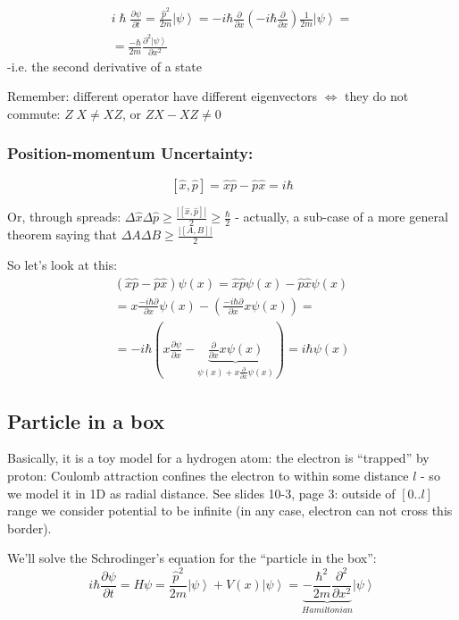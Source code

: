 \documentclass{scrartcl}
\newcommand{\ket}[1]{\left| #1 \right>} %
\begin{document}
\begin{gather*}
  i \; \hbar \; \frac{\partial \psi}{\partial t} = \frac{\hat p^2}{2 m} \ket
  \psi = -i \hbar \frac\partial{\partial x} (-i \hbar \frac\partial{\partial x})
  \frac1{2m} \ket\psi = \\
  = \frac{-\hbar}{2m}\frac{\partial^2 \ket\psi}{\partial x^2}
\end{gather*}
-i.e. the second derivative of a state

Remember: different operator have different eigenvectors $\Leftrightarrow$ they
do not commute: $Z \; X \neq X Z$, or $ZX - XZ \neq 0$

\subsubsection{Position-momentum Uncertainty:}
$$[\hat x, \hat p] = \hat x \hat p - \hat p \hat x = i\hbar$$

Or, through spreads: $\Delta\hat x \Delta\hat p \geq \frac{|[\hat x, \hat p]|}2
\geq \frac \hbar 2$ - actually, a sub-case of a more general theorem saying that
$ \Delta A \Delta B \geq \frac{|[A, B]|}2$

So let's look at this: \begin{gather*}(\hat x \hat p - \hat p \hat x) \psi(x) =
  \hat x \hat p \psi(x) - \hat p \hat x \psi(x) \\
  = x \frac{-i \hbar \partial }{\partial x} \psi(x) - \left( \frac{-i
      \hbar \partial
    }{\partial x} x \psi(x)\right) = \\
  = -i \hbar \left(x \frac{\partial \psi}{\partial x} - \underbrace{
      \frac \partial {\partial x} x \psi(x)}_{\psi(x) + x\frac\partial{\partial
        x} \psi(x) } \right) = i \hbar \psi(x)
\end{gather*}

\subsection{Particle in a box}
\label{sec:Particle-in-a-box}

Basically, it is a toy model for a hydrogen atom: the electron is ``trapped'' by
proton: Coulomb attraction confines the electron to within some distance $l$ -
so we model it in 1D as radial distance. See slides 10-3, page 3: outside of
$[0..l]$ range we consider potential to be infinite (in any case, electron can
not cross this border).

We'll solve the Schrodinger's equation for the ``particle in the box'':
$$i \hbar \frac{\partial \psi}{\partial t} = H \psi = \frac{\hat{p}^2}{2m}
\ket\psi + V(x) \ket \psi = \underbrace{-\frac{\hbar^2}{2m}
  \frac{\partial^2}{\partial x^2}}_{Hamiltonian} \ket\psi $$
\end{document}
